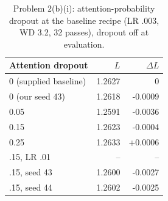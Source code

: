 \begin{table}[H]\centering\small\caption{Problem 2(b)(i): attention-probability dropout at the baseline recipe (LR .003, WD 3.2, 32 passes), dropout off at evaluation.}\label{tab:drop}
\begin{tabular}{lrr}\toprule Attention dropout & $L$ & $\Delta L$ \\ \midrule
0 (supplied baseline) & 1.2627 & 0 \\
0 (our seed 43) & 1.2618 & -0.0009 \\
0.05 & 1.2591 & -0.0036 \\
0.15 & 1.2623 & -0.0004 \\
0.25 & 1.2633 & +0.0006 \\
.15, LR .01 & -- & -- \\
.15, seed 43 & 1.2600 & -0.0027 \\
.15, seed 44 & 1.2602 & -0.0025 \\
\bottomrule\end{tabular}\end{table}
